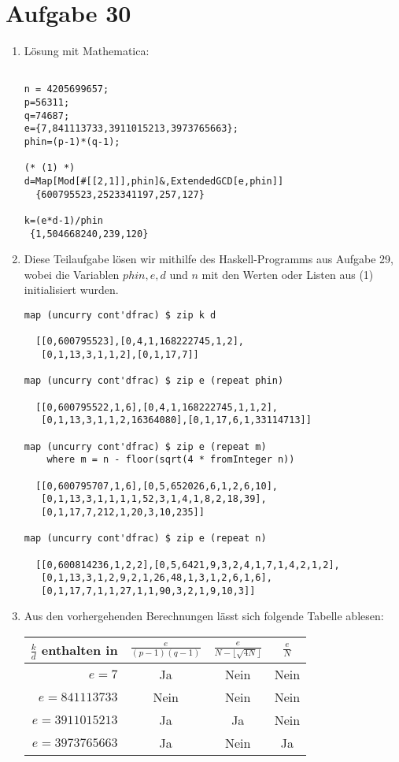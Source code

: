 \section*{Aufgabe 30}
\begin{enumerate}[(1)]
\item Lösung mit Mathematica:
\begin{lstlisting}

n = 4205699657;
p=56311;
q=74687;
e={7,841113733,3911015213,3973765663};
phin=(p-1)*(q-1);

(* (1) *)
d=Map[Mod[#[[2,1]],phin]&,ExtendedGCD[e,phin]]
  {600795523,2523341197,257,127}

k=(e*d-1)/phin
 {1,504668240,239,120}
\end{lstlisting}
\item
Diese Teilaufgabe lösen wir mithilfe des Haskell-Programms aus Aufgabe 29,
wobei die Variablen $phin, e, d$ und $n$ mit den Werten oder Listen aus (1)
initialisiert wurden.
\lstset{language=Haskell}
\begin{lstlisting}
map (uncurry cont'dfrac) $ zip k d

  [[0,600795523],[0,4,1,168222745,1,2],
   [0,1,13,3,1,1,2],[0,1,17,7]]

map (uncurry cont'dfrac) $ zip e (repeat phin)

  [[0,600795522,1,6],[0,4,1,168222745,1,1,2],
   [0,1,13,3,1,1,2,16364080],[0,1,17,6,1,33114713]]

map (uncurry cont'dfrac) $ zip e (repeat m)
	where m = n - floor(sqrt(4 * fromInteger n))

  [[0,600795707,1,6],[0,5,652026,6,1,2,6,10],
   [0,1,13,3,1,1,1,1,52,3,1,4,1,8,2,18,39],
   [0,1,17,7,212,1,20,3,10,235]]

map (uncurry cont'dfrac) $ zip e (repeat n)

  [[0,600814236,1,2,2],[0,5,6421,9,3,2,4,1,7,1,4,2,1,2],
   [0,1,13,3,1,2,9,2,1,26,48,1,3,1,2,6,1,6],
   [0,1,17,7,1,1,27,1,1,90,3,2,1,9,10,3]]

\end{lstlisting}
\item
Aus den vorhergehenden Berechnungen lässt sich folgende Tabelle ablesen:
\begin{center}
\begin{tabular}[]{r|c|c|c}
	$\frac{k}{d}$ enthalten in&$\frac{e}{(p-1)(q-1)}$&$\frac{e}{N-\lfloor\sqrt{4N}\rfloor}$&$\frac{e}{N}$\\
	\hline
	$e=7$&Ja&Nein&Nein\\
	\hline
	$e=841113733$&Nein&Nein&Nein\\
	\hline
	$e=3911015213$&Ja&Ja&Nein\\
	\hline
	$e=3973765663$&Ja&Nein&Ja
\end{tabular}
\end{center}
\end{enumerate}
